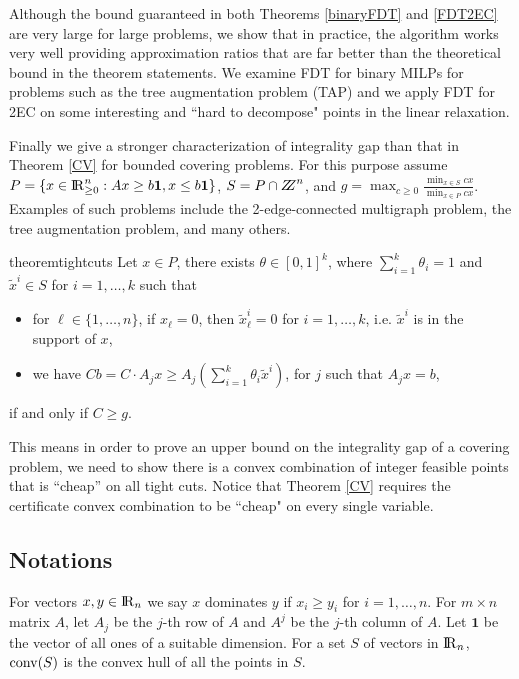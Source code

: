 Although the bound guaranteed in both Theorems \ref{binaryFDT} and \ref{FDT2EC} are very large for large problems, we show that in practice, the algorithm works very well providing approximation ratios that are far better than the theoretical bound in the theorem statements. We examine FDT for binary MILPs for problems such as the tree augmentation problem (TAP) and we apply FDT for 2EC on some interesting and ``hard to decompose" points in the linear relaxation. 

Finally we give a stronger characterization of integrality gap than that in Theorem \ref{CV} for bounded covering problems. For this purpose assume $P= \{x\in {\rm I\!R}^n_{\geq 0}: Ax\geq b\textbf{1}, x \leq b\textbf{1}\}$, $S= P\cap \bbbz^n$, and $g= \max_{c\geq 0} \frac{\min_{x\in S}cx}{\min_{x\in P}cx}$. Examples of such problems include the 2-edge-connected multigraph problem, the tree augmentation problem, and many others.


\begin{restatable}{theorem}{tightcuts}
	\label{tightcuts}
	Let $x\in P$, there exists $\theta\in [0,1]^k$, where $\sum_{i=1}^{k}\theta_i = 1$ and $\tilde{x}^i \in S$ for $i=1,\ldots,k$ such that \begin{itemize}
		\item for $\ell\in \{1,\ldots,n\}$, if $x_\ell =0$, then $\tilde{x}^i_\ell=0$ for $i =1,\ldots,k$, i.e. $\tilde{x}^i$ is in the support of $x$,
		\item we have $Cb = C\cdot A_j x \geq A_j (\sum_{i=1}^{k}\theta_i\tilde{x}^i)$, for $j$ such that $A_j x =b$,  
	\end{itemize}
	if and only if $C\geq g$.
\end{restatable}



This means in order to prove an upper bound on the integrality gap of a covering problem, we need to show there is a convex combination of integer feasible points that is ``cheap'' on all tight cuts. Notice that Theorem \ref{CV} requires the certificate convex combination to be ``cheap" on every single variable.


\subsection{Notations}
For vectors $x,y\in {\rm I\!R}_{n}$ we say $x$ dominates $y$ if $x_i\geq y_i$ for $i= 1,\ldots,n$. For $m\times n$ matrix $A$, let $A_j$ be the $j$-th row of $A$ and $A^j$ be the $j$-th column of $A$. Let $\textbf{1}$ be the vector of all ones of a suitable dimension. For a set $S$ of vectors in ${\rm I\!R}_{n}$, $\operatorname{conv}(S)$ is the convex hull of all the points in $S$.

